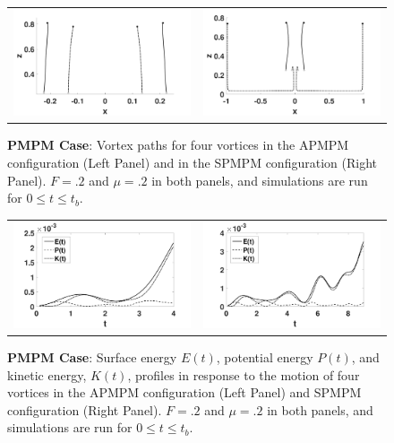 \documentclass[a4paper,11pt]{article}
\begin{document}
%
\begin{figure}[!h]
\centering
\begin{tabular}{cc}
\includegraphics[width=.5\textwidth]{tracks_F_pt2_tf_4_pmpm} & 
\includegraphics[width=.5\textwidth]{tracks_F_pt2_tf_9_pmpm_sym}
\end{tabular}
\caption{\small  {\bf PMPM Case}: Vortex paths for four vortices in the APMPM configuration  (Left Panel) and in the SPMPM configuration (Right Panel). $F=.2$ and $\mu=.2$ in both panels, and simulations are run for $0\leq t \leq t_{b}$.}
\label{fig:trackpmpm}
\end{figure}

\begin{figure}[!h]
\centering
\begin{tabular}{cc}
\includegraphics[width=.5\textwidth]{energy_profile_mu_pt2_F_pt2_pmpm} &
\includegraphics[width=.5\textwidth]{energy_profile_mu_pt2_F_pt2_pmpm_sym}
\end{tabular}
\caption{\small {\bf PMPM Case}:  Surface energy $E(t)$, potential energy $P(t)$, and kinetic energy, $K(t)$, profiles in response to the motion of four vortices in the APMPM configuration (Left Panel) and SPMPM configuration (Right Panel).  $F=.2$ and $\mu=.2$ in both panels, and simulations are run for $0\leq t \leq t_{b}$.}
\label{fig:eprof_pmpm}
\end{figure}
\end{document}
